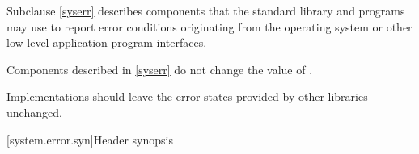 \pnum
Subclause \ref{syserr} describes components that the standard library and
\Cpp{} programs may use to report error conditions originating from
the operating system or other low-level application program interfaces.

\pnum
Components described in \ref{syserr} do not change the value of
.

\recommended
Implementations should leave the error states provided by other
libraries unchanged.

[system.error.syn]{Header  synopsis}

%
%
%
%
%
%
%
%
